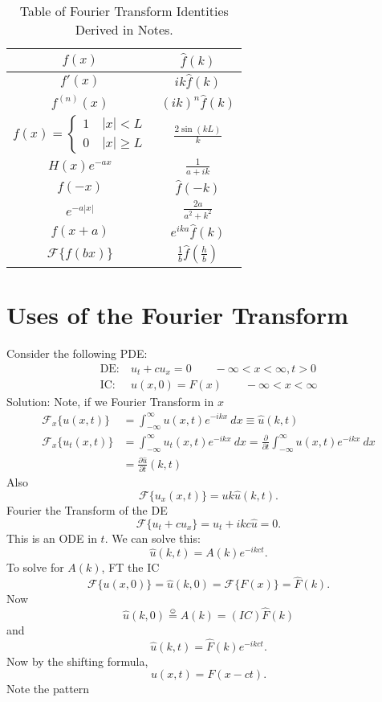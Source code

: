 \documentclass[cm]{article}
\renewcommand{\F}{\mathscr F}
\newcommand{\fhat}{\hat{f}}
\renewcommand{\infint}{\int_{-\infty}^{\infty}}
\newcommand{\uhat}{\hat{u}}
\newcommand{\Fhat}{\hat{F}}
\begin{document}
\begin{table}
\begin{centering}
\begin{tabular}{|c | c|}
    \hline
    $f(x)$ & $\fhat(k)$ \\
    \hline \hline
    $f'(x)$ & $ik\fhat(k)$ \\ \hline
    $f^{(n)}(x)$ & $(ik)^n\fhat(k)$\\ \hline
    $f(x) = \begin{cases} 1 \quad |x| < L \\ 0 \quad |x| \geq L \end{cases}$ &  $\frac{2\sin
        (kL)}{k}$ \\ \hline
    $H(x) e^{-ax}$ &  $\frac{1}{a+ik}$ \\ \hline
    $f(-x)$ &  $\fhat(-k)$ \\ \hline
    $e^{-a|x|}$ &  $\frac{2a}{a^2 + k^2}$ \\ \hline
    $f(x+a)$ &  $e^{ika} \fhat(k)$\\ \hline
    $\F \{ f(bx) \}$ & $ \frac{1}{b} \fhat \left( \frac{h}{b} \right)$ \\
    \hline
\end{tabular}
\end{centering}
\caption{Table of Fourier Transform Identities Derived in Notes.}
\end{table}

\section{Uses of the Fourier Transform}
Consider the following PDE:
    \begin{align*}
    \text{DE:}&~ u_t + cu_x = 0 \qquad - \infty < x < \infty, t > 0 \\
    \text{IC:}&~ u(x,0) = F(x) \qquad - \infty < x < \infty
    \end{align*}
Solution: Note, if we Fourier Transform in $x$
    \begin{align*}
    \F_x\{u(x,t)\} &= \infint u(x,t) e^{-ikx}~dx \equiv \uhat(k,t) \\
    \F_x\{u_t(x,t)\} &= \infint u_t(x,t) e^{-ikx}~dx = \frac{\partial}
    {\partial t}
    \infint u(x,t) e^{-ikx}~dx \\
    &= \frac{\partial \uhat}{\partial t}(k,t)
    \end{align*}
Also
    $$\F\{u_x(x,t)\} = uk\uhat(k,t).$$
Fourier the Transform of the DE
\begin{equation*}
\F\{u_t + cu_x\} = \uhat_t + ikc \uhat = 0. \tag{\smiley}
\end{equation*}
This is an ODE in $t$. We can solve this:
$$\uhat(k,t) = A(k) e^{-ikct}.$$
To solve for $A(k)$, FT the IC
$$\F\{u(x,0)\} = \uhat(k,0) = \F\{F(x)\} = \Fhat(k).$$
Now
$$\uhat(k,0) \stackrel{\smiley}{=} A(k) =(IC) \Fhat(k)$$
and
$$\uhat(k,t) = \Fhat(k) e^{-ikct}.$$
Now by the shifting formula,
$$u(x,t) =  F(x - ct).$$
Note the pattern
\end{document}
